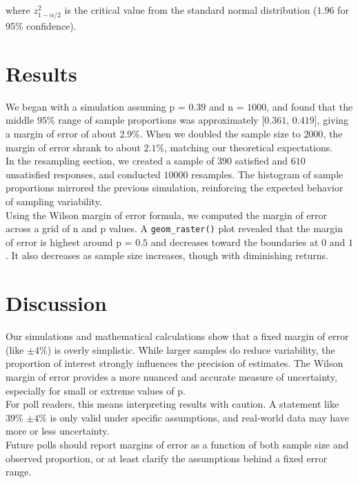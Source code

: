 \documentclass{article}\usepackage[]{graphicx}\usepackage[]{xcolor}
\begin{document}
\begin{multicols}{2}
\noindent where $z_{1-\alpha/2}^2$ is the critical value from the standard normal distribution ($1.96$ for $95\%$ confidence).


\section{Results}

We began with a simulation assuming p = $0.39$ and n = $1000$, and found that the middle $95\%$ range of sample proportions was approximately [$0.361$, $0.419$], giving a margin of error of about $2.9\%$. When we doubled the sample size to $2000$, the margin of error shrank to about $2.1\%$, matching our theoretical expectations.\\

\noindent In the resampling section, we created a sample of $390$ satisfied and $610$ unsatisfied responses, and conducted $10000$ resamples. The histogram of sample proportions mirrored the previous simulation, reinforcing the expected behavior of sampling variability.\\

\noindent Using the Wilson margin of error formula, we computed the margin of error across a grid of n and p values. A \texttt{geom\_raster()} plot revealed that the margin of error is highest around p = $0.5$ and decreases toward the boundaries at $0$ and $1$. It also decreases as sample size increases, though with diminishing returns.

\section{Discussion}

Our simulations and mathematical calculations show that a fixed margin of error (like $\pm 4\%$) is overly simplistic. While larger samples do reduce variability, the proportion of interest strongly influences the precision of estimates. The Wilson margin of error provides a more nuanced and accurate measure of uncertainty, especially for small or extreme values of p.\\

\noindent For poll readers, this means interpreting results with caution. A statement like $39\%$ $\pm 4\%$ is only valid under specific assumptions, and real-world data may have more or less uncertainty.\\

\noindent Future polls should report margins of error as a function of both sample size and observed proportion, or at least clarify the assumptions behind a fixed error range.


\vspace{2em}


\begin{tiny}

\end{tiny}
\end{multicols}
\end{document}
